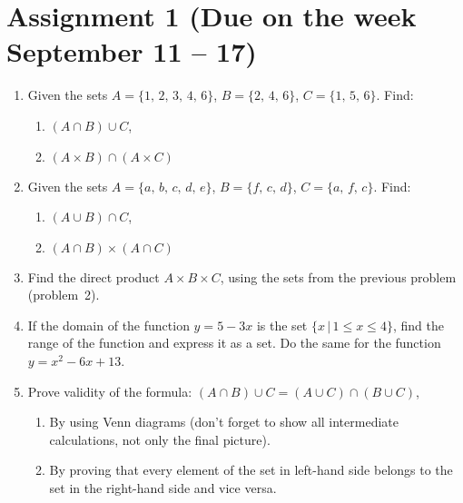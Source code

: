 \documentclass[12pt]{article} %
\theoremstyle{definition} %
\begin{document}
\section{Assignment 1 (Due on the week September 11 – 17)}

\begin{enumerate}

\item Given the sets $A=\{1,\, 2,\, 3,\, 4,\, 6\}$, $B=\{2,\, 4,\, 6\}$, $C=\{1,\, 5,\, 6\}$.  Find:

	\begin{enumerate}
\item $(A\cap B)\cup C$,
\item $(A\times B)\cap (A\times C)$
\end{enumerate}

\item Given the sets $A=\{a,\, b,\, c,\, d,\, e\}$, $B=\{f,\, c,\, d\}$, $C=\{a,\, f,\, c\}$.  Find:
	\begin{enumerate}
\item $(A\cup B)\cap C$,
\item $(A\cap B)\times (A\cap C)$
\end{enumerate}


\item Find the direct product $A\times B\times C$, using the sets from the previous problem (problem~2).

\item  If the domain of the function $y=5-3x$ is the set $\{x\,|\,1\leqslant x\leqslant 4\}$, find the range of the function and express it as a set. Do the same for the function $y=x^2-6x+13$.

\item Prove validity of the formula: $(A\cap B)\cup C=(A\cup C)\cap (B\cup C)$,
\begin{enumerate}
\item By using Venn diagrams (don't forget to show all intermediate calculations, not only the final picture).
\item By proving that every element of the set in left-hand side belongs to the set in the right-hand side and vice versa.
\end{enumerate}

\end{enumerate}
\end{document}
